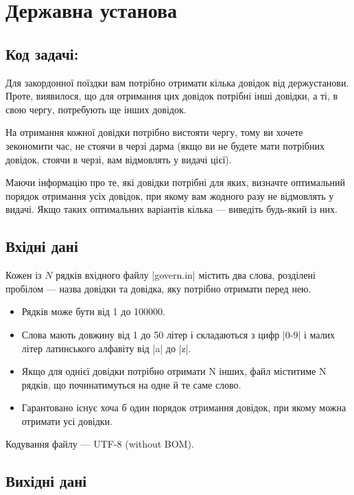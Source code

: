 \documentclass[12pt,a4paper]{article}
\begin{document}
\section*{Державна установа \hfill {}}


\subsection*{Код задачі: }

Для закордонної поїздки вам потрібно отримати кілька довідок від держустанови. Проте, виявилося, що для отримання цих довідок потрібні інші довідки, а ті, в свою чергу, потребують ще інших довідок.

На отримання кожної довідки потрібно вистояти чергу, тому ви хочете зекономити час, не стоячи в черзі дарма (якщо ви не будете мати потрібних довідок, стоячи в черзі, вам відмовлять у видачі цієї).

Маючи інформацію про те, які довідки потрібні для яких, визначте оптимальний порядок отримання усіх довідок, при якому вам жодного разу не відмовлять у видачі. Якщо таких оптимальних варіантів кілька --- виведіть будь-який із них.


\subsection*{Вхідні дані}

Кожен із \(N\) рядків вхідного файлу |govern.in| містить два слова, розділені пробілом --- назва довідки та довідка, яку потрібно отримати перед нею.

\begin{itemize}
    \item Рядків може бути від 1 до 100000.
    \item Слова мають довжину від 1 до 50 літер і складаються з цифр |0-9| і малих літер латинського алфавіту від |a| до |z|.
    \item Якщо для однієї довідки потрібно отримати N інших, файл міститиме N рядків, що починатимуться на одне й те саме слово.
    \item Гарантовано існує хоча б один порядок отримання довідок, при якому можна отримати усі довідки.
\end{itemize}

Кодування файлу --- UTF-8 (without BOM).


\subsection*{Вихідні дані}
\end{document}
